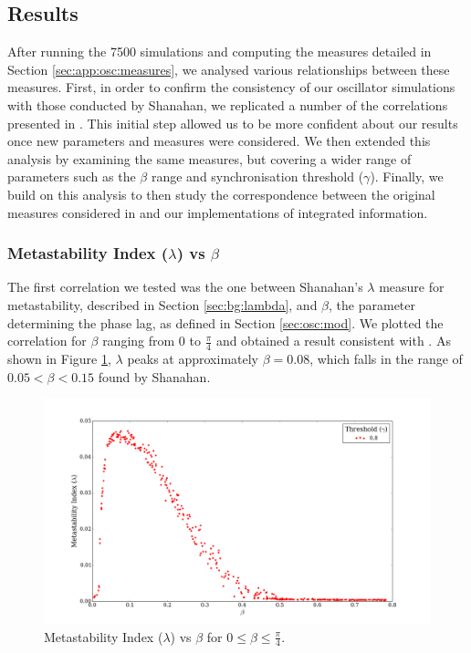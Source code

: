 \documentclass[a4paper,11pt]{article}
\begin{document}
\subsection{Results}
\label{sec:app:osc:res}

After running the 7500 simulations and computing the measures detailed in Section \ref{sec:app:osc:measures}, we analysed various relationships between these measures. First, in order to confirm the consistency of our oscillator simulations with those conducted by Shanahan, we replicated a number of the correlations presented in \cite{Shanahan2010}. This initial step allowed us to be more confident about our results once new parameters and measures were considered. We then extended this analysis by examining the same measures, but covering a wider range of parameters such as the $\beta$ range and synchronisation threshold ($\gamma$). Finally, we build on this analysis to then study the correspondence between the original measures considered in \cite{Shanahan2010} and our implementations of integrated information.

\subsubsection{Metastability Index ($\lambda$) vs $\beta$}
\label{sec:app:osc:res:meta-v-beta}

The first correlation we tested was the one between Shanahan's $\lambda$ measure for metastability, described in Section \ref{sec:bg:lambda}, and $\beta$, the parameter determining the phase lag, as defined in Section \ref{sec:osc:mod}. We plotted the correlation for $\beta$ ranging from $0$ to $\frac{\pi}{4}$ and obtained a result consistent with \cite{Shanahan2010}. As shown in Figure \ref{fig:lambda-vs-beta-orig}, $\lambda$ peaks at approximately $\beta = 0.08$, which falls in the range of $0.05 < \beta < 0.15$ found by Shanahan.

\begin{figure}[H]
\begin{center}
\includegraphics[scale = 0.35]{figures/lambda_vs_beta_orig}
\end{center}
\caption{
	Metastability Index ($\lambda$) vs $\beta$ for $0 \leq \beta \leq \frac{\pi}{4}$.
	\label{fig:lambda-vs-beta-orig}
}
\end{figure}
\end{document}

